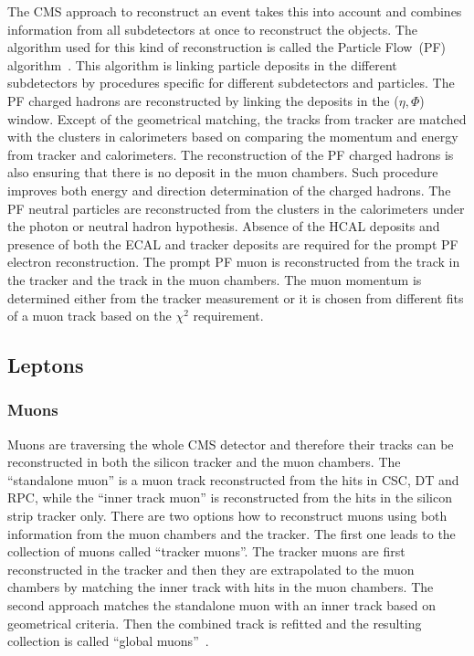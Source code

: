 The CMS approach to reconstruct an event takes this into account and combines information from all subdetectors at once to reconstruct the objects. The algorithm used for this kind of reconstruction is called the Particle Flow~(PF) algorithm~\cite{Sirunyan:2017ulk}. This algorithm is linking particle deposits in the different subdetectors by procedures specific for different subdetectors and particles. The PF charged hadrons are reconstructed by linking the deposits in the ($\eta,\Phi$) window. Except of the geometrical matching, the tracks from tracker are matched with the clusters in calorimeters based on comparing the momentum and energy from tracker and calorimeters. The reconstruction of the PF charged hadrons is also ensuring that there is no deposit in the muon chambers. Such procedure improves both energy and direction determination of the charged hadrons. The PF neutral particles are reconstructed from the clusters in the calorimeters under the photon or neutral hadron hypothesis. Absence of the HCAL deposits and presence of both the ECAL and tracker deposits are required for the prompt PF electron reconstruction. The prompt PF muon is reconstructed from the track in the tracker and the track in the muon chambers. The muon momentum is determined either from the tracker measurement or it is chosen from different fits of a muon track based on the $\chi^{2}$ requirement.


\subsection{Leptons}

\subsubsection{Muons}

Muons are traversing the whole CMS detector and therefore their tracks can be reconstructed in both the silicon tracker and the muon chambers. The ``standalone muon'' is a muon track reconstructed from the hits in CSC, DT and RPC, while the ``inner track muon'' is reconstructed from the hits in the silicon strip tracker only. There are two options how to reconstruct muons using both information from the muon chambers and the tracker. The first one leads to the collection of muons called ``tracker muons''.  The tracker muons are first reconstructed in the tracker and then they are extrapolated to the muon chambers by matching the inner track with hits in the muon chambers. The second approach matches the standalone muon with an inner track based on geometrical criteria. Then the combined track is refitted and the resulting collection is called ``global muons''~\cite{Chatrchyan:2012xi}. 

